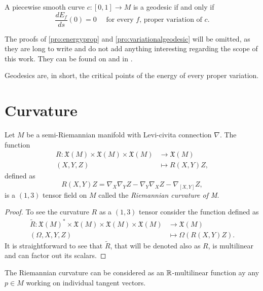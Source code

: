 \begin{proposition}
	\label{pro:variationalgeodesic}
	A piecewise smooth curve $c \colon [0,1] \to M$ is a geodesic if and only if
	\[
		\frac{dE_f}{ds}(0) = 0 \quad \textrm{ for every $f$, proper variation of $c$}.
	\]
\end{proposition}

The proofs of \autoref{pro:energyprop} and \autoref{pro:variationalgeodesic} will be omitted, as they are long to write and do not add anything interesting regarding the scope of this work. They can be found on \cite[Ch. 9, Prop. 2.4]{docarmo79} and in \cite[Ch. 9, Prop. 2.5]{docarmo79}.

Geodesics are, in short, the critical points of the energy of every proper variation.

\section{Curvature}

\begin{lemma}
	Let $M$ be a semi-Riemannian manifold with Levi-civita connection $\nabla$. The function
	\begin{align*}
		R \colon \mathfrak{X}(M) \times \mathfrak{X}(M) \times \mathfrak{X}(M) &\to \mathfrak{X}(M) \\
		(X, Y, Z) &\mapsto R(X,Y)Z,
	\end{align*}
	defined as
	\[
		R(X,Y)Z = \nabla_X \nabla_Y Z - \nabla_Y \nabla_X Z - \nabla_{[X,Y]} Z,
	\]
	is a $(1,3)$ tensor field on $M$ called the \emph{Riemannian curvature of M}.
\end{lemma}

\begin{proof}
	To see the curvature $R$ as a $(1,3)$ tensor consider the function defined as
		\begin{align*}
		\tilde{R} \colon \mathfrak{X}(M)^* \times \mathfrak{X}(M) \times \mathfrak{X}(M) \times \mathfrak{X}(M) &\to \mathfrak{X}(M) \\
		(\Omega, X, Y, Z) &\mapsto \Omega\left(R(X,Y)Z\right).
	\end{align*}
	It is straightforward to see that $\tilde{R}$, that will be denoted also as $R$, is multilinear and can factor out its scalars.
\end{proof}

The Riemannian curvature can be considered as an $\mathbb{R}$-multilinear function ay any $p\in M$ working on individual tangent vectors.

